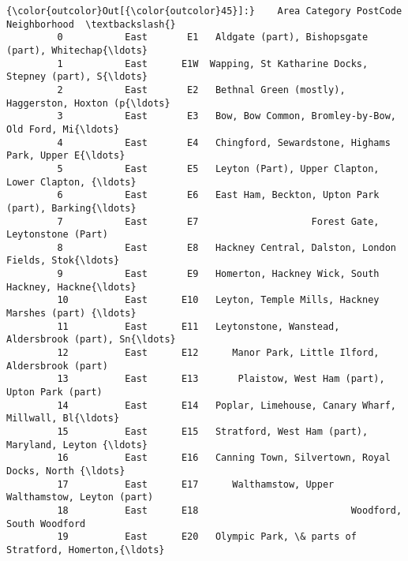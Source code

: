 \documentclass[11pt]{article}
\begin{document}
\begin{Verbatim}[commandchars=\\\{\}]
{\color{outcolor}Out[{\color{outcolor}45}]:}    Area Category PostCode                                       Neighborhood  \textbackslash{}
         0           East       E1   Aldgate (part), Bishopsgate (part), Whitechap{\ldots}   
         1           East      E1W  Wapping, St Katharine Docks, Stepney (part), S{\ldots}   
         2           East       E2   Bethnal Green (mostly), Haggerston, Hoxton (p{\ldots}   
         3           East       E3   Bow, Bow Common, Bromley-by-Bow, Old Ford, Mi{\ldots}   
         4           East       E4   Chingford, Sewardstone, Highams Park, Upper E{\ldots}   
         5           East       E5   Leyton (Part), Upper Clapton, Lower Clapton, {\ldots}   
         6           East       E6   East Ham, Beckton, Upton Park (part), Barking{\ldots}   
         7           East       E7                    Forest Gate, Leytonstone (Part)   
         8           East       E8   Hackney Central, Dalston, London Fields, Stok{\ldots}   
         9           East       E9   Homerton, Hackney Wick, South Hackney, Hackne{\ldots}   
         10          East      E10   Leyton, Temple Mills, Hackney Marshes (part) {\ldots}   
         11          East      E11   Leytonstone, Wanstead, Aldersbrook (part), Sn{\ldots}   
         12          East      E12      Manor Park, Little Ilford, Aldersbrook (part)   
         13          East      E13       Plaistow, West Ham (part), Upton Park (part)   
         14          East      E14   Poplar, Limehouse, Canary Wharf, Millwall, Bl{\ldots}   
         15          East      E15   Stratford, West Ham (part), Maryland, Leyton {\ldots}   
         16          East      E16   Canning Town, Silvertown, Royal Docks, North {\ldots}   
         17          East      E17      Walthamstow, Upper Walthamstow, Leyton (part)   
         18          East      E18                           Woodford, South Woodford   
         19          East      E20   Olympic Park, \& parts of Stratford, Homerton,{\ldots}   
         

\end{Verbatim}
\end{document}
